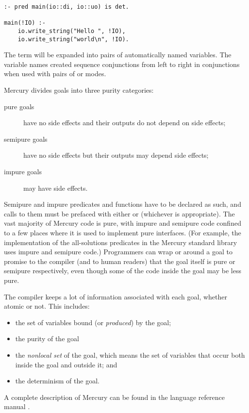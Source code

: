 \begin{verbatim}
:- pred main(io::di, io::uo) is det.

main(!IO) :-
    io.write_string("Hello ", !IO),
    io.write_string("world\n", !IO).
\end{verbatim}

\noindent
The term  will be expanded into pairs of automatically named
variables.
The variable names created sequence conjunctions from left to right in
conjunctions when used with pairs of  or 
modes.

\label{page:purity}
Mercury divides goals into three purity categories:

\begin{description}

    \item[pure goals] have no side effects
    and their outputs do not depend on side effects;

    \item[semipure goals] have no side effects
    but their outputs may depend side effects;

    \item[impure goals] may have side effects.

\end{description}

\noindent
Semipure and impure predicates and functions
have to be declared as such,
and calls to them must be prefaced with either
 or  (whichever is appropriate).
The vast majority of Mercury code is pure,
with impure and semipure code confined to a few places
where it is used to implement pure interfaces.
(For example, the implementation of the all-solutions predicates
in the Mercury standard library uses impure and semipure code.)
Programmers can wrap
 or  around a goal
to promise to the compiler (and to human readers) that
the goal itself is pure or semipure respectively,
even though some of the code inside the goal may be less pure.

The compiler keeps a lot of information associated with each goal,
whether atomic or not.
This includes:

\begin{itemize}
\item
the set of variables bound (or \emph{produced}) by the goal;
\item
the purity of the goal
\item
the \emph{nonlocal set} of the goal,
which means the set of variables
that occur both inside the goal and outside it; and
\item
the determinism of the goal.
\end{itemize}

\noindent
A complete description of Mercury
can be found in the language reference manual \cite{mercury_refman}.

